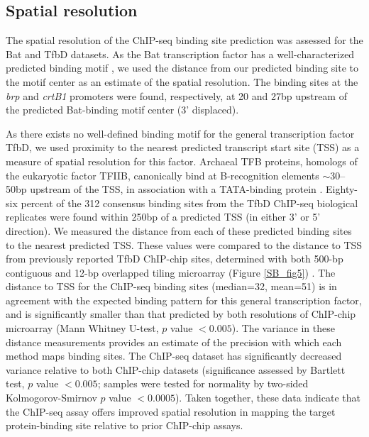 \subsection{Spatial resolution}

The spatial resolution of the ChIP-seq binding site prediction was assessed for the Bat and TfbD datasets. As the Bat transcription factor has a well-characterized predicted binding motif \cite{baliga_genomic_2001}, we used the distance from our predicted binding site to the motif center as an estimate of the spatial resolution. The binding sites at the {\em brp} and {\em crtB1} promoters were found, respectively, at 20 and 27bp upstream of the predicted Bat-binding motif center (3' displaced).

As there exists no well-defined binding motif for the general transcription factor TfbD, we used proximity to the nearest predicted transcript start site (TSS) as a measure of spatial resolution for this factor. Archaeal TFB proteins, homologs of the eukaryotic factor TFIIB, canonically bind at B-recognition elements $\sim$30–50bp upstream of the TSS, in association with a TATA-binding protein \cite{bell_transcription_1998}. Eighty-six percent of the 312 consensus binding sites from the TfbD ChIP-seq biological replicates were found within 250bp of a predicted TSS (in either 3' or 5' direction). We measured the distance from each of these predicted binding sites to the nearest predicted TSS. These values were compared to the distance to TSS from previously reported TfbD ChIP-chip sites, determined with both 500-bp contiguous and 12-bp overlapped tiling microarray (Figure \ref{SB_fig5}) \cite{facciotti_general_2007}. The distance to TSS for the ChIP-seq binding sites (median=32, mean=51) is in agreement with the expected binding pattern for this general transcription factor, and is significantly smaller than that predicted by both resolutions of ChIP-chip microarray (Mann Whitney U-test, $p$ value $<0.005$). The variance in these distance measurements provides an estimate of the precision with which each method maps binding sites. The ChIP-seq dataset has significantly decreased variance relative to both ChIP-chip datasets (significance assessed by Bartlett test, $p$ value $<0.005$; samples were tested for normality by two-sided Kolmogorov-Smirnov $p$ value $<0.0005$). Taken together, these data indicate that the ChIP-seq assay offers improved spatial resolution in mapping the target protein-binding site relative to prior ChIP-chip assays.


